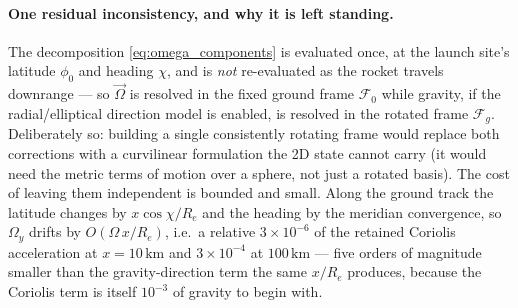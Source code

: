 \paragraph{One residual inconsistency, and why it is left standing.} The decomposition
\autoref{eq:omega_components} is evaluated once, at the launch site's latitude $\phi_0$ and
heading $\chi$, and is \emph{not} re-evaluated as the rocket travels downrange --- so
$\vec{\Omega}$ is resolved in the fixed ground frame $\mathcal{F}_0$ while gravity, if the
radial/elliptical direction model is enabled, is resolved in the rotated frame $\mathcal{F}_g$.
Deliberately so: building a single consistently rotating frame would replace both corrections with
a curvilinear formulation the 2D state cannot carry (it would need the metric terms of motion over
a sphere, not just a rotated basis). The cost of leaving them independent is bounded and small.
Along the ground track the latitude changes by $x\cos\chi/R_e$ and the heading by the meridian
convergence, so $\Omega_y$ drifts by $O(\Omega\,x/R_e)$, i.e.\ a relative $3\times10^{-6}$ of the
retained Coriolis acceleration at $x=10\,\mathrm{km}$ and $3\times10^{-4}$ at $100\,\mathrm{km}$
--- five orders of magnitude smaller than the gravity-direction term the same $x/R_e$ produces,
because the Coriolis term is itself $10^{-3}$ of gravity to begin with.
